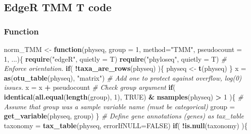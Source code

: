 \documentclass[
]{book}
\newenvironment{Shaded}{\begin{snugshade}}{\end{snugshade}}
\newcommand{\CommentTok}[1]{\textcolor[rgb]{0.56,0.35,0.01}{\textit{#1}}}
\newcommand{\ControlFlowTok}[1]{\textcolor[rgb]{0.13,0.29,0.53}{\textbf{#1}}}
\newcommand{\DataTypeTok}[1]{\textcolor[rgb]{0.13,0.29,0.53}{#1}}
\newcommand{\DecValTok}[1]{\textcolor[rgb]{0.00,0.00,0.81}{#1}}
\newcommand{\KeywordTok}[1]{\textcolor[rgb]{0.13,0.29,0.53}{\textbf{#1}}}
\newcommand{\NormalTok}[1]{#1}
\newcommand{\OperatorTok}[1]{\textcolor[rgb]{0.81,0.36,0.00}{\textbf{#1}}}
\newcommand{\OtherTok}[1]{\textcolor[rgb]{0.56,0.35,0.01}{#1}}
\newcommand{\StringTok}[1]{\textcolor[rgb]{0.31,0.60,0.02}{#1}}
\begin{document}
\hypertarget{edger-tmm-t-code}{%
\subsection{EdgeR TMM T code}\label{edger-tmm-t-code}}

\hypertarget{function-4}{%
\subsubsection{Function}\label{function-4}}

\begin{Shaded}
\begin{Highlighting}[]
\NormalTok{norm\_TMM \textless{}{-}}\StringTok{ }\ControlFlowTok{function}\NormalTok{(physeq, }\DataTypeTok{group =} \DecValTok{1}\NormalTok{, }\DataTypeTok{method=}\StringTok{"TMM"}\NormalTok{, }\DataTypeTok{pseudocount =} \DecValTok{1}\NormalTok{, ...)\{}
    \KeywordTok{require}\NormalTok{(}\StringTok{"edgeR"}\NormalTok{, }\DataTypeTok{quietly =}\NormalTok{ T)}
    \KeywordTok{require}\NormalTok{(}\StringTok{"phyloseq"}\NormalTok{, }\DataTypeTok{quietly =}\NormalTok{ T)}
    \CommentTok{\# Enforce orientation.}
    \ControlFlowTok{if}\NormalTok{( }\OperatorTok{!}\KeywordTok{taxa\_are\_rows}\NormalTok{(physeq) )\{ physeq \textless{}{-}}\StringTok{ }\KeywordTok{t}\NormalTok{(physeq) \}}
\NormalTok{    x =}\StringTok{ }\KeywordTok{as}\NormalTok{(}\KeywordTok{otu\_table}\NormalTok{(physeq), }\StringTok{"matrix"}\NormalTok{)}
    \CommentTok{\# Add one to protect against overflow, log(0) issues.}
\NormalTok{    x =}\StringTok{ }\NormalTok{x }\OperatorTok{+}\StringTok{ }\NormalTok{pseudocount}
    \CommentTok{\# Check \textasciigrave{}group\textasciigrave{} argument}
    \ControlFlowTok{if}\NormalTok{( }\KeywordTok{identical}\NormalTok{(}\KeywordTok{all.equal}\NormalTok{(}\KeywordTok{length}\NormalTok{(group), }\DecValTok{1}\NormalTok{), }\OtherTok{TRUE}\NormalTok{) }\OperatorTok{\&}\StringTok{ }\KeywordTok{nsamples}\NormalTok{(physeq) }\OperatorTok{\textgreater{}}\StringTok{ }\DecValTok{1}\NormalTok{ )\{}
        \CommentTok{\# Assume that group was a sample variable name (must be categorical)}
\NormalTok{        group =}\StringTok{ }\KeywordTok{get\_variable}\NormalTok{(physeq, group)}
\NormalTok{    \}}
    \CommentTok{\# Define gene annotations (\textasciigrave{}genes\textasciigrave{}) as tax\_table}
\NormalTok{    taxonomy =}\StringTok{ }\KeywordTok{tax\_table}\NormalTok{(physeq, }\DataTypeTok{errorIfNULL=}\OtherTok{FALSE}\NormalTok{)}
    \ControlFlowTok{if}\NormalTok{( }\OperatorTok{!}\KeywordTok{is.null}\NormalTok{(taxonomy) )\{}

\end{Highlighting}
\end{Shaded}
\end{document}
